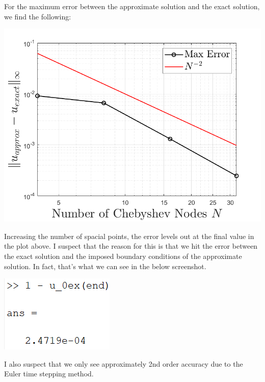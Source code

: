 \documentclass{article}
\begin{document}
\begin{itemize}
\begin{center}
    \end{center}
    For the maximum error between the approximate solution and the exact solution, we find the following:
    \begin{center}
        \includegraphics[scale = 0.3]{errProbii}
    \end{center}
    Increasing the number of spacial points, the error levels out at the final value in the plot above. I suspect that the reason for this is that we hit the error between the exact solution and the imposed boundary conditions of the approximate solution. In fact, that's what we can see in the below screenshot. 
    \begin{center}
        \includegraphics[scale = 0.7]{boundaryError}
    \end{center}
    I also suspect that we only see approximately 2nd order accuracy due to the Euler time stepping method. 
    
\end{itemize}
\end{document}
